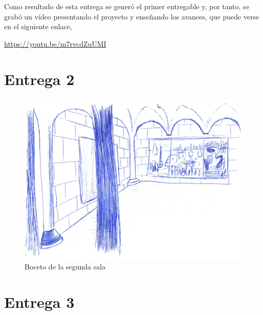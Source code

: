 Como resultado de esta entrega se generó el primer entregable y, por tanto, se grabó un vídeo presentando el proyecto y enseñando los avances, que puede verse en el siguiente enlace,

\begin{center}
    \url{https://youtu.be/m7rvcdZuUMI}
\end{center}


\section{Entrega 2}

\begin{figure}[!h]
\begin{center}
\includegraphics[width=1\textwidth]{imagenes/7/bocetos/boceto-sala-2.png}
\caption{Boceto de la segunda sala}
\label{fig:bocetos-salas-2}
\end{center}
\end{figure}

\section{Entrega 3}

